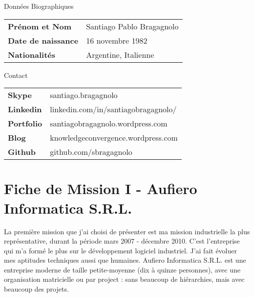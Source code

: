 \documentclass{resume} %
\begin{document}
\begin{rSection}{Donn\'{e}es Biographiques}

\begin{tabular}{ @{} >{\bfseries}l @{\hspace{6ex}} l }
	Pr\'enom et Nom & Santiago Pablo Bragagnolo  \\
	Date de naissance & 16 novembre 1982  \\
	Nationalités & Argentine, Italienne  \\
\end{tabular}

\end{rSection}


\begin{rSection}{Contact}

\begin{tabular}{ @{} >{\bfseries}l @{\hspace{6ex}} l }
	Skype & santiago.bragagnolo  \\
	Linkedin & linkedin.com/in/santiagobragagnolo/  \\
	Portfolio & santiagobragagnolo.wordpress.com  \\
	Blog & knowledgeconvergence.wordpress.com  \\
	Github & github.com/sbragagnolo \\
\end{tabular}

\end{rSection}



\section{Fiche de Mission I - Aufiero Informatica S.R.L.}

	La premi\`ere mission que j'ai choisi de pr\'esenter est ma mission industrielle la plus repr\'esentative, durant la période mars 2007 - décembre 2010. C'est l'entreprise qui m'a form\'e le plus sur le développement logiciel industriel. J'ai fait évoluer mes aptitudes techniques aussi que humaines. 
	Aufiero Informatica S.R.L. est une entreprise moderne de taille petite-moyenne (dix \`a quinze personnes), avec une organisation matricielle ou par project : sans beaucoup de hiérarchies, mais avec beaucoup des projets. 
	
\end{document}
